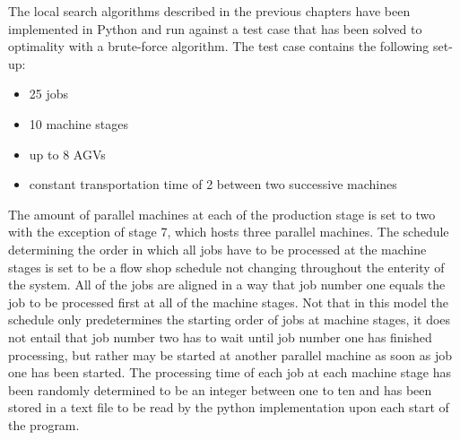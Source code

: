 The local search algorithms described in the previous chapters have been implemented in Python and run against a test case that has been solved to optimality with a brute-force algorithm. The test case contains the following set-up:
\begin{itemize}
\item 25 jobs
\item 10 machine stages
\item up to 8 AGVs
\item constant transportation time of 2 between two successive machines
\end{itemize}
The amount of parallel machines at each of the production stage is set to two with the exception of stage 7, which hosts three parallel machines. The schedule determining the order in which all jobs have to be processed at the machine stages is set to be a flow shop schedule not changing throughout the enterity of the system. All of the jobs are aligned in a way that job number one equals the job to be processed first at all of the machine stages. Not that in this model the schedule only predetermines the starting order of jobs at machine stages, it does not entail that job number two has to wait until job number one has finished processing, but rather may be started at another parallel machine as soon as job one has been started. The processing time of each job at each machine stage has been randomly determined to be an integer between one to ten and has been stored in a text file to be read by the python implementation upon each start of the program.

